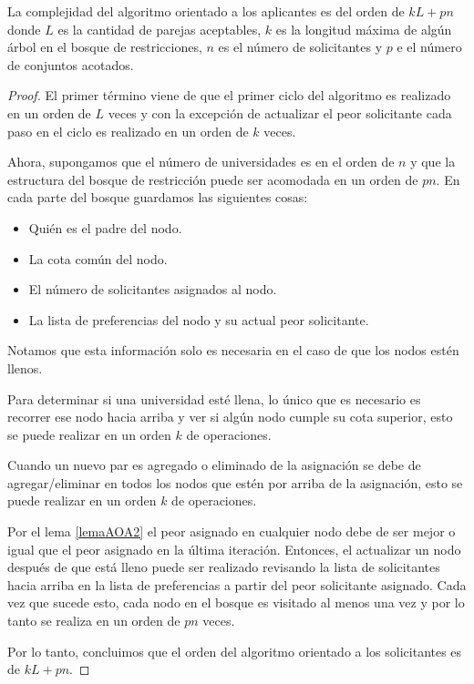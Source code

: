 \begin{teo}
La complejidad del algoritmo orientado a los aplicantes es del orden de $kL+pn$ donde $L$ es la cantidad de parejas aceptables, $k$ es la longitud máxima de algún árbol en el bosque de restricciones, $n$ es el número de solicitantes y $p$ e el número de conjuntos acotados. 
\end{teo}
\begin{proof}
El primer término viene de que el primer ciclo del algoritmo es realizado en un orden de $L$ veces y con la excepción de actualizar el peor solicitante cada paso en el ciclo es realizado en un orden de $k$ veces.  

Ahora, supongamos que el número de universidades es en el orden de $n$ y que la estructura del bosque de restricción puede ser acomodada en un orden de $pn$. En cada parte del bosque guardamos las siguientes cosas:
\begin{itemize}
\item Quién es el padre del nodo. 
\item La cota común del nodo. 
\item El número de solicitantes asignados al nodo.
\item La lista de preferencias del nodo y su actual peor solicitante. 
\end{itemize}
Notamos que esta información solo es necesaria en el caso de que los nodos estén llenos. 

Para determinar si una universidad esté llena, lo único que es necesario es recorrer ese nodo hacia arriba y ver si algún nodo cumple su cota superior, esto se puede realizar en un orden $k$ de operaciones. 

Cuando un nuevo par es agregado o eliminado de la asignación se debe de agregar/eliminar en todos los nodos que estén por arriba de la asignación, esto se puede realizar en un orden $k$ de operaciones. 

Por el lema \ref{lemaAOA2} el peor asignado en cualquier nodo debe de ser mejor o igual que el peor asignado en la última iteración. Entonces, el actualizar un nodo después de que está lleno puede ser realizado revisando la lista de solicitantes hacia arriba en la lista de preferencias a partir del peor solicitante asignado. Cada vez que sucede esto, cada nodo en el bosque es visitado al menos una vez y por lo tanto se realiza en un orden de $pn$ veces.

Por lo tanto, concluimos que el orden del algoritmo orientado a los solicitantes es de $kL+pn$.

\end{proof}



